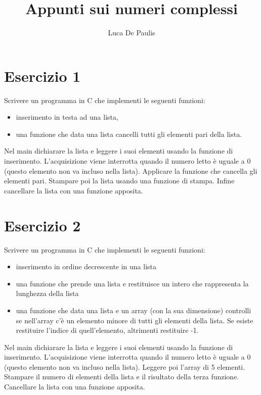 \documentclass[italian,oneside,headinclude,10pt]{scrartcl}
\begin{document}
\author{Luca De Paulis}
\title{Appunti sui numeri complessi}
\maketitle


\section{Esercizio 1}

Scrivere un programma in C che implementi le seguenti funzioni:
\begin{itemize}
    \item inserimento in testa ad una lista,
    \item una funzione che data una lista cancelli tutti gli elementi pari della lista. 
\end{itemize}

Nel main dichiarare la lista e leggere i suoi elementi usando la funzione di inserimento. L'acquisizione viene interrotta quando il numero letto è uguale a $0$ (questo elemento non va incluso nella lista). Applicare la funzione che cancella gli elementi pari. Stampare poi la lista usando una funzione di stampa. Infine cancellare la lista con una funzione apposita.

\section{Esercizio 2}
Scrivere un programma in C che implementi le seguenti funzioni:
\begin{itemize}
    \item inserimento in ordine decrescente in una lista
    \item una funzione che prende una lista e restituisce un intero che rappresenta la lunghezza della lista
    \item una funzione che data una lista e un array (con la sua dimensione) controlli se nell'array c'è un elemento minore di tutti gli elementi della lista. Se esiste restituire l'indice di quell'elemento, altrimenti restituire -1.
\end{itemize}

Nel main dichiarare la lista e leggere i suoi elementi usando la funzione di inserimento. L'acquisizione viene interrotta quando il numero letto è uguale a $0$ (questo elemento non va incluso nella lista). Leggere poi l'array di 5 elementi. Stampare il numero di elementi della lista e il risultato della terza funzione. Cancellare la lista con una funzione apposita.
\end{document}
